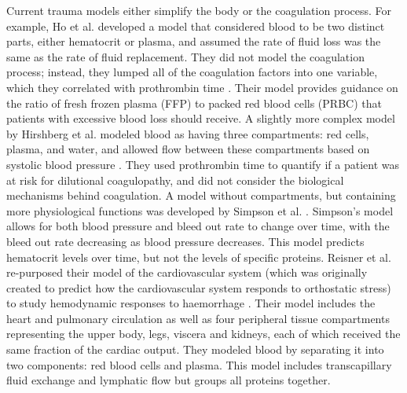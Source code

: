 \documentclass[11pt]{article}
\begin{document}
Current trauma models either simplify the body or the coagulation process.
For example, Ho et al. developed a model that considered blood to be two distinct parts, either hematocrit or plasma, and assumed the rate of fluid loss was the same as the rate of fluid replacement. They did not model the coagulation process; instead, they lumped all of the coagulation factors into one variable, which they correlated with prothrombin time \cite{ho2005mathematical}.
Their model provides guidance on the ratio of fresh frozen plasma (FFP) to packed red blood cells (PRBC) that patients with excessive blood loss should receive.
A slightly more complex model by Hirshberg et al. modeled blood as having three compartments: red cells, plasma, and water, and allowed flow between these compartments based on systolic blood pressure \cite{hirshberg2003minimizing}. They used prothrombin time to quantify if a patient was at risk for dilutional coagulopathy, and did not consider the biological mechanisms behind coagulation. A model without compartments, but containing more physiological functions was developed by Simpson et al. \cite{simpson1996computer}.
Simpson's model allows for both blood pressure and bleed out rate to change over time, with the bleed out rate decreasing as blood pressure decreases. This model predicts hematocrit levels over time, but not the levels of specific proteins. Reisner et al. re-purposed their model of the cardiovascular system (which was originally created to predict how the cardiovascular system responds to orthostatic stress) to study hemodynamic responses to haemorrhage \cite{reisner2013computational}.
Their model includes the heart and pulmonary circulation as well as four peripheral tissue compartments representing the upper body, legs, viscera and kidneys, each of which received the same fraction of the cardiac output. They modeled blood by separating it into two components: red blood cells and plasma.
This model includes transcapillary fluid exchange and lymphatic flow but groups all proteins together.
\end{document}
